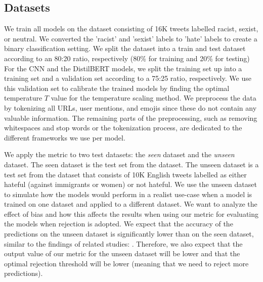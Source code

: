 \subsection{Datasets}
We train all models on the \citet{waseem2016hateful} dataset consisting of 16K tweets labelled racist, sexist, or neutral.
%
We converted the 'racist' and 'sexist' labels to 'hate' labels to create a binary classification setting.
%
We split the dataset into a train and test dataset according to an 80:20 ratio, respectively (80\% for training and 20\% for testing)
%
For the CNN and the DistilBERT models, we split the training set up into a training set and a validation set according to a 75:25 ratio, respectively.
%
We use this validation set to calibrate the trained models by finding the optimal temperature $T$ value for the temperature scaling method.
%
We preprocess the data by tokenizing all URLs, user mentions, and emojis since these do not contain any valuable information.
The remaining parts of the preprocessing, such as removing whitespaces and stop words or the tokenization process, are dedicated to the different frameworks we use per model.
%

%
We apply the metric to two test datasets: the \emph{seen} dataset and the \textit{unseen} dataset.
%
The seen dataset is the test set from the \citet{waseem2016hateful} dataset.
%
The unseen dataset is a test set from the \citet{basile2019semeval} dataset that consists of 10K English tweets labelled as either hateful (against immigrants or women) or not hateful.
%
We use the unseen dataset to simulate how the models would perform in a realist use-case when a model is trained on one dataset and applied to a different dataset.
%
We want to analyze the effect of bias and how this affects the results when using our metric for evaluating the models when rejection is adopted.
%
We expect that the accuracy of the predictions on the unseen dataset is significantly lower than on the seen dataset, similar to the findings of related studies: \citet{grondahl2018all, arango2019hate}.
%
Therefore, we also expect that the output value of our metric for the unseen dataset will be lower and that the optimal rejection threshold will be lower (meaning that we need to reject more predictions).
%

